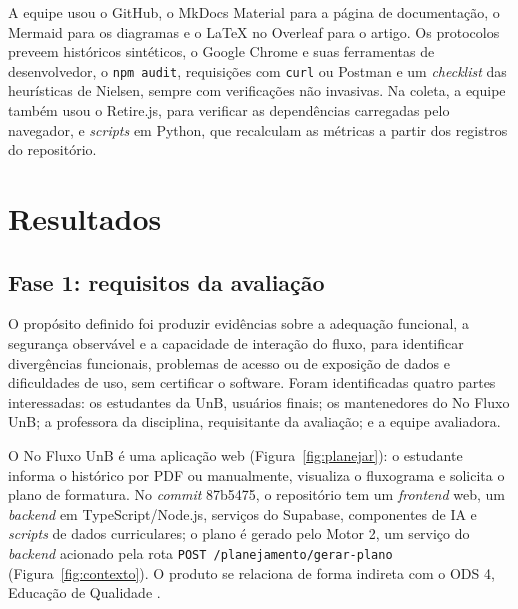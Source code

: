 \documentclass[12pt]{article}
\begin{document}
A equipe usou o GitHub, o MkDocs Material para a página de documentação, o Mermaid
para os diagramas e o LaTeX no Overleaf para o artigo. Os protocolos preveem
históricos sintéticos, o Google Chrome e suas ferramentas de desenvolvedor, o
\texttt{npm audit}, requisições com \texttt{curl} ou Postman e um \textit{checklist}
das heurísticas de Nielsen, sempre com verificações não invasivas. Na coleta, a
equipe também usou o Retire.js, para verificar as dependências carregadas pelo
navegador, e \textit{scripts} em Python, que recalculam as métricas a partir dos
registros do repositório.

\section{Resultados}\label{sec:resultados}

\subsection{Fase 1: requisitos da avaliação}\label{sec:fase1}

O propósito definido foi produzir evidências sobre a adequação funcional, a
segurança observável e a capacidade de interação do fluxo, para identificar divergências
funcionais, problemas de acesso ou de exposição de dados e dificuldades de uso, sem
certificar o software. Foram identificadas quatro partes interessadas: os estudantes
da UnB, usuários finais; os mantenedores do No Fluxo UnB; a professora da disciplina,
requisitante da avaliação; e a equipe avaliadora.

O No Fluxo UnB é uma aplicação web (Figura~\ref{fig:planejar}): o estudante informa
o histórico por PDF ou manualmente, visualiza o fluxograma e solicita o plano de
formatura. No \textit{commit} 87b5475, o repositório \cite{nofluxo2026repo} tem um
\textit{frontend} web, um \textit{backend} em TypeScript/Node.js, serviços do
Supabase, componentes de IA e \textit{scripts} de dados curriculares; o plano é
gerado pelo Motor 2, um serviço do \textit{backend} acionado pela rota
\texttt{POST /planejamento/gerar-plano} (Figura~\ref{fig:contexto}). O produto se
relaciona de forma indireta com o ODS 4, Educação de Qualidade \cite{onu2015agenda}.
\end{document}
